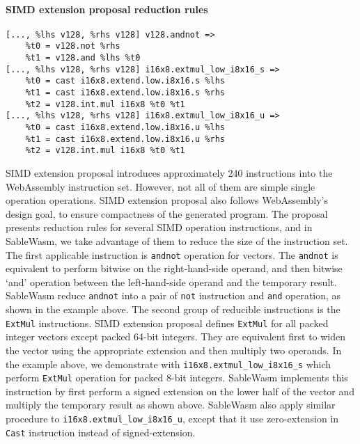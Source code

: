 \paragraph{SIMD extension proposal reduction rules} \quad
\begin{lstlisting}[basicstyle=\linespread{1}\small\ttfamily, language=SableWasmMIR]
[..., %lhs v128, %rhs v128] v128.andnot =>
    %t0 = v128.not %rhs 
    %t1 = v128.and %lhs %t0
[..., %lhs v128, %rhs v128] i16x8.extmul_low_i8x16_s =>
    %t0 = cast i16x8.extend.low.i8x16.s %lhs
    %t1 = cast i16x8.extend.low.i8x16.s %rhs
    %t2 = v128.int.mul i16x8 %t0 %t1
[..., %lhs v128, %rhs v128] i16x8.extmul_low_i8x16_u =>
    %t0 = cast i16x8.extend.low.i8x16.u %lhs
    %t1 = cast i16x8.extend.low.i8x16.u %rhs
    %t2 = v128.int.mul i16x8 %t0 %t1
\end{lstlisting}
SIMD extension proposal introduces approximately 240 instructions into the WebAssembly instruction set. However, not all of them are simple single operation operations. SIMD extension proposal also follows WebAssembly's design goal, to ensure compactness of the generated program. The proposal presents reduction rules for several SIMD operation instructions, and in SableWasm, we take advantage of them to reduce the size of the instruction set. The first applicable instruction is \texttt{andnot} operation for vectors. The \texttt{andnot} is equivalent to perform bitwise on the right-hand-side operand, and then bitwise `and' operation between the left-hand-side operand and the temporary result. SableWasm reduce \texttt{andnot} into a pair of \texttt{not} instruction and \texttt{and} operation, as shown in the example above. The second group of reducible instructions is the \texttt{ExtMul} instructions. SIMD extension proposal defines \texttt{ExtMul} for all packed integer vectors except packed 64-bit integers. They are equivalent first to widen the vector using the appropriate extension and then multiply two operands. In the example above, we demonstrate with \texttt{i16x8.extmul\_low\_i8x16\_s} which perform \texttt{ExtMul} operation for packed 8-bit integers. SableWasm implements this instruction by first perform a signed extension on the lower half of the vector and multiply the temporary result as shown above. SableWasm also apply similar procedure to \texttt{i16x8.extmul\_low\_i8x16\_u}, except that it use zero-extension in \texttt{Cast} instruction instead of signed-extension.


